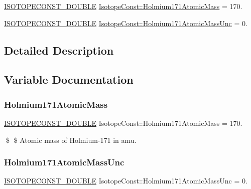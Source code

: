 \begin{DoxyCompactItemize}
\item 
\mbox{\hyperlink{group___isotope_const-_macros_ga8f45a7272ce02c0b4c65c44636ed719a}{I\+S\+O\+T\+O\+P\+E\+C\+O\+N\+S\+T\+\_\+\+D\+O\+U\+B\+LE}} \mbox{\hyperlink{group___isotope_const-_holmium-_ho171_ga35fe0a824cdafd92ed8c2dd2797ed860}{Isotope\+Const\+::\+Holmium171\+Atomic\+Mass}} = 170.
\item 
\mbox{\hyperlink{group___isotope_const-_macros_ga8f45a7272ce02c0b4c65c44636ed719a}{I\+S\+O\+T\+O\+P\+E\+C\+O\+N\+S\+T\+\_\+\+D\+O\+U\+B\+LE}} \mbox{\hyperlink{group___isotope_const-_holmium-_ho171_gaf577edd4afbe5954f38d02683bda6eef}{Isotope\+Const\+::\+Holmium171\+Atomic\+Mass\+Unc}} = 0.
\end{DoxyCompactItemize}


\subsection{Detailed Description}


\subsection{Variable Documentation}
\mbox{\label{group___isotope_const-_holmium-_ho171_ga35fe0a824cdafd92ed8c2dd2797ed860}} 
\subsubsection{\texorpdfstring{Holmium171\+Atomic\+Mass}{Holmium171AtomicMass}}
{\footnotesize\ttfamily \mbox{\hyperlink{group___isotope_const-_macros_ga8f45a7272ce02c0b4c65c44636ed719a}{I\+S\+O\+T\+O\+P\+E\+C\+O\+N\+S\+T\+\_\+\+D\+O\+U\+B\+LE}} Isotope\+Const\+::\+Holmium171\+Atomic\+Mass = 170.}

\$ \$ Atomic mass of Holmium-\/171 in amu. \mbox{\label{group___isotope_const-_holmium-_ho171_gaf577edd4afbe5954f38d02683bda6eef}} 
\subsubsection{\texorpdfstring{Holmium171\+Atomic\+Mass\+Unc}{Holmium171AtomicMassUnc}}
{\footnotesize\ttfamily \mbox{\hyperlink{group___isotope_const-_macros_ga8f45a7272ce02c0b4c65c44636ed719a}{I\+S\+O\+T\+O\+P\+E\+C\+O\+N\+S\+T\+\_\+\+D\+O\+U\+B\+LE}} Isotope\+Const\+::\+Holmium171\+Atomic\+Mass\+Unc = 0.}

